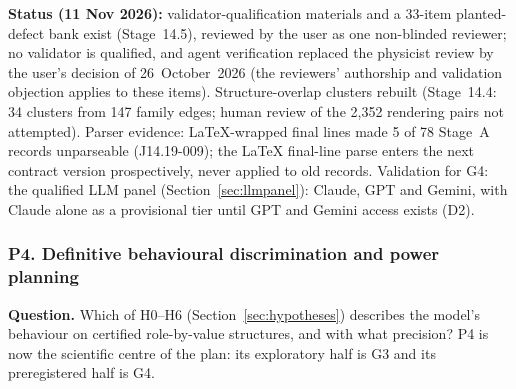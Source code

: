 \documentclass[10pt,a4paper]{article}
\begin{document}
\textbf{Status (11 Nov 2026):} validator-qualification materials and a 33-item planted-defect bank exist
(Stage~14.5), reviewed by the user as one non-blinded reviewer; no validator is qualified, and agent verification
replaced the physicist review by the user's decision of 26~October~2026 (the reviewers' authorship and validation
objection applies to these items). Structure-overlap clusters rebuilt (Stage~14.4: 34 clusters from 147 family
edges; human review of the 2,352 rendering pairs not attempted). Parser evidence: LaTeX-wrapped final lines made 5
of 78 Stage~A records unparseable (J14.19-009); the LaTeX final-line parse enters the next contract version
prospectively, never applied to old records. Validation for G4: the qualified LLM panel (Section~\ref{sec:llmpanel}): Claude, GPT and Gemini, with Claude alone as a provisional tier until GPT and Gemini access exists (D2).

\subsubsection{P4. Definitive behavioural discrimination and power planning}
\label{sec:blockP4}

\textbf{Question.} Which of H0--H6 (Section~\ref{sec:hypotheses}) describes the model's behaviour on certified
role-by-value structures, and with what precision? P4 is now the scientific centre of the plan: its exploratory
half is G3 and its preregistered half is G4.
\end{document}
